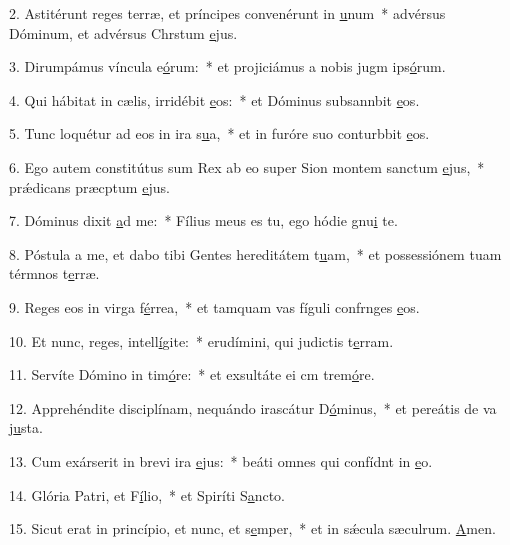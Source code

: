 2. Astitérunt reges terræ, et príncipes convenérunt in \uline{u}num~* advérsus Dóminum, et advérsus Chrstum \uline{e}jus.\par 
3. Dirumpámus víncula e\uline{ó}rum:~* et projiciámus a nobis jugm ips\uline{ó}rum.\par 
4. Qui hábitat in cælis, irridébit \uline{e}os:~* et Dóminus subsannbit \uline{e}os.\par 
5. Tunc loquétur ad eos in ira s\uline{u}a,~* et in furóre suo conturbbit \uline{e}os.\par 
6. Ego autem constitútus sum Rex ab eo super Sion montem sanctum \uline{e}jus,~* prǽdicans præcptum \uline{e}jus.\par 
7. Dóminus dixit \uline{a}d me:~* Fílius meus es tu, ego hódie gnu\uline{i} te.\par 
8. Póstula a me, et dabo tibi Gentes hereditátem t\uline{u}am,~* et possessiónem tuam térmnos t\uline{e}rræ.\par 
9. Reges eos in virga f\uline{é}rrea,~* et tamquam vas fíguli confrnges \uline{e}os.\par 
10. Et nunc, reges, intell\uline{í}gite:~* erudímini, qui judictis t\uline{e}rram.\par 
11. Servíte Dómino in tim\uline{ó}re:~* et exsultáte ei cm trem\uline{ó}re.\par 
12. Apprehéndite disciplínam, nequándo irascátur D\uline{ó}minus,~* et pereátis de va j\uline{u}sta.\par 
13. Cum exárserit in brevi ira \uline{e}jus:~* beáti omnes qui confídnt in \uline{e}o.\par 
14. Glória Patri, et F\uline{í}lio,~* et Spiríti S\uline{a}ncto.\par 
15. Sicut erat in princípio, et nunc, et s\uline{e}mper,~* et in sǽcula sæculrum. \uline{A}men.\par 
